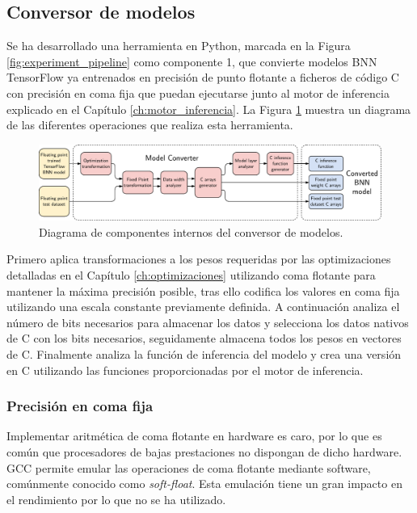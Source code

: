 \subsection{Conversor de modelos}

Se ha desarrollado una herramienta en Python, marcada en la Figura \ref{fig:experiment_pipeline} como componente 1, que convierte modelos BNN TensorFlow ya entrenados en precisión de punto flotante a ficheros de código C con precisión en coma fija que puedan ejecutarse junto al motor de inferencia explicado en el Capítulo \ref{ch:motor_inferencia}. La Figura \ref{fig:model_converter} muestra un diagrama de las diferentes operaciones que realiza esta herramienta.

\begin{figure}[h]
	\centering
	\includegraphics[width=\textwidth]{root/Imagenes/metodologia/model_converter.pdf}
	\caption{Diagrama de componentes internos del conversor de modelos.}
	\label{fig:model_converter}
\end{figure}

Primero aplica transformaciones a los pesos requeridas por las optimizaciones detalladas en el Capítulo \ref{ch:optimizaciones} utilizando coma flotante para mantener la máxima precisión posible, tras ello codifica los valores en coma fija utilizando una escala constante previamente definida. A continuación analiza el número de bits necesarios para almacenar los datos y selecciona los datos nativos de C con los bits necesarios, seguidamente almacena todos los pesos en vectores de C. Finalmente analiza la función de inferencia del modelo y crea una versión en C utilizando las funciones proporcionadas por el motor de inferencia.

\subsubsection{Precisión en coma fija}

Implementar aritmética de coma flotante en hardware es caro, por lo que es común que procesadores de bajas prestaciones no dispongan de dicho hardware. GCC permite emular las operaciones de coma flotante mediante software, comúnmente conocido como \textit{soft-float}. Esta emulación tiene un gran impacto en el rendimiento por lo que no se ha utilizado.

